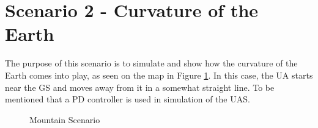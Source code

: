 \section{Scenario 2 - Curvature of the Earth}\label{sec:scenario2}
The purpose of this scenario is to simulate and show how the curvature of the Earth comes into play, as seen on the map in Figure \ref{fig:s2_map}. In this case, the UA starts near the GS and moves away from it in a somewhat straight line. To be mentioned that a PD controller is used in simulation of the UAS.

\begin{figure}[H]
	\hfill
	\hfill
	\hfill
	\caption{Mountain Scenario}
	\label{fig:s2_map}
\end{figure}



